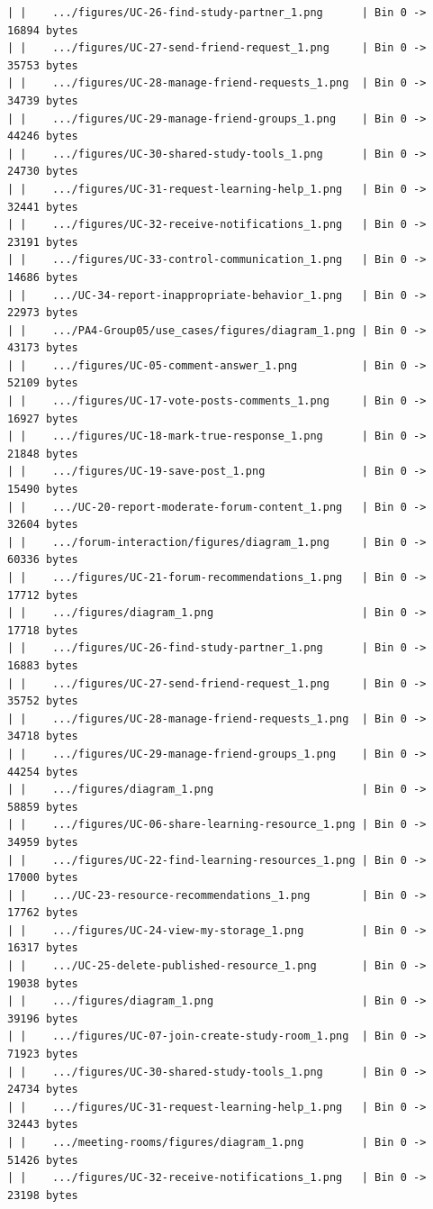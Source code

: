 \documentclass[12pt]{article}
\begin{document}
\begin{lstlisting}[numbers=none,breaklines=true]
| |    .../figures/UC-26-find-study-partner_1.png      | Bin 0 -> 16894 bytes
| |    .../figures/UC-27-send-friend-request_1.png     | Bin 0 -> 35753 bytes
| |    .../figures/UC-28-manage-friend-requests_1.png  | Bin 0 -> 34739 bytes
| |    .../figures/UC-29-manage-friend-groups_1.png    | Bin 0 -> 44246 bytes
| |    .../figures/UC-30-shared-study-tools_1.png      | Bin 0 -> 24730 bytes
| |    .../figures/UC-31-request-learning-help_1.png   | Bin 0 -> 32441 bytes
| |    .../figures/UC-32-receive-notifications_1.png   | Bin 0 -> 23191 bytes
| |    .../figures/UC-33-control-communication_1.png   | Bin 0 -> 14686 bytes
| |    .../UC-34-report-inappropriate-behavior_1.png   | Bin 0 -> 22973 bytes
| |    .../PA4-Group05/use_cases/figures/diagram_1.png | Bin 0 -> 43173 bytes
| |    .../figures/UC-05-comment-answer_1.png          | Bin 0 -> 52109 bytes
| |    .../figures/UC-17-vote-posts-comments_1.png     | Bin 0 -> 16927 bytes
| |    .../figures/UC-18-mark-true-response_1.png      | Bin 0 -> 21848 bytes
| |    .../figures/UC-19-save-post_1.png               | Bin 0 -> 15490 bytes
| |    .../UC-20-report-moderate-forum-content_1.png   | Bin 0 -> 32604 bytes
| |    .../forum-interaction/figures/diagram_1.png     | Bin 0 -> 60336 bytes
| |    .../figures/UC-21-forum-recommendations_1.png   | Bin 0 -> 17712 bytes
| |    .../figures/diagram_1.png                       | Bin 0 -> 17718 bytes
| |    .../figures/UC-26-find-study-partner_1.png      | Bin 0 -> 16883 bytes
| |    .../figures/UC-27-send-friend-request_1.png     | Bin 0 -> 35752 bytes
| |    .../figures/UC-28-manage-friend-requests_1.png  | Bin 0 -> 34718 bytes
| |    .../figures/UC-29-manage-friend-groups_1.png    | Bin 0 -> 44254 bytes
| |    .../figures/diagram_1.png                       | Bin 0 -> 58859 bytes
| |    .../figures/UC-06-share-learning-resource_1.png | Bin 0 -> 34959 bytes
| |    .../figures/UC-22-find-learning-resources_1.png | Bin 0 -> 17000 bytes
| |    .../UC-23-resource-recommendations_1.png        | Bin 0 -> 17762 bytes
| |    .../figures/UC-24-view-my-storage_1.png         | Bin 0 -> 16317 bytes
| |    .../UC-25-delete-published-resource_1.png       | Bin 0 -> 19038 bytes
| |    .../figures/diagram_1.png                       | Bin 0 -> 39196 bytes
| |    .../figures/UC-07-join-create-study-room_1.png  | Bin 0 -> 71923 bytes
| |    .../figures/UC-30-shared-study-tools_1.png      | Bin 0 -> 24734 bytes
| |    .../figures/UC-31-request-learning-help_1.png   | Bin 0 -> 32443 bytes
| |    .../meeting-rooms/figures/diagram_1.png         | Bin 0 -> 51426 bytes
| |    .../figures/UC-32-receive-notifications_1.png   | Bin 0 -> 23198 bytes

\end{lstlisting}
\end{document}

